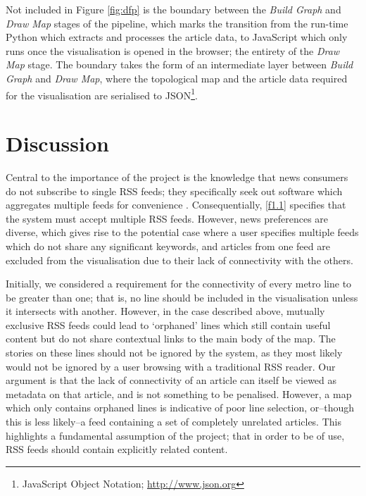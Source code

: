 Not included in Figure \ref{fig:dfp} is the boundary between the \textit{Build Graph} and \textit{Draw Map} stages of the pipeline, which marks the transition from the run-time Python which extracts and processes the article data, to JavaScript which only runs once the visualisation is opened in the browser; the entirety of the  \textit{Draw Map} stage. The boundary takes the form of an intermediate layer between \textit{Build Graph} and \textit{Draw Map}, where the topological map and the article data required for the visualisation are serialised to JSON\footnote{JavaScript Object Notation; \url{http://www.json.org}}.

\section{Discussion}

Central to the importance of the project is the knowledge that news consumers do not subscribe to single RSS feeds; they specifically seek out software which aggregates multiple feeds for convenience \citep{nreader}. Consequentially, \ref{f1.1} specifies that the system must accept multiple RSS feeds. However, news preferences are diverse, which gives rise to the potential case where a user specifies multiple feeds which do not share any significant keywords, and articles from one feed are excluded from the visualisation due to their lack of connectivity with the others. 

Initially, we considered a requirement for the connectivity \citep{GeneratingInformationMaps} of every metro line to be greater than one; that is, no line should be included in the visualisation unless it intersects with another. However, in the case described above, mutually exclusive RSS feeds could lead to `orphaned' lines which still contain useful content but do not share contextual links to the main body of the map. The stories on these lines should not be ignored by the system, as they most likely would not be ignored by a user browsing with a traditional RSS reader. Our argument is that the lack of connectivity of an article can itself be viewed as metadata on that article, and is not something to be penalised. However, a map which only contains orphaned lines is indicative of poor line selection, or--though this is less likely--a feed containing a set of completely unrelated articles. This highlights a fundamental assumption of the project; that in order to be of use, RSS feeds should contain explicitly related content.

